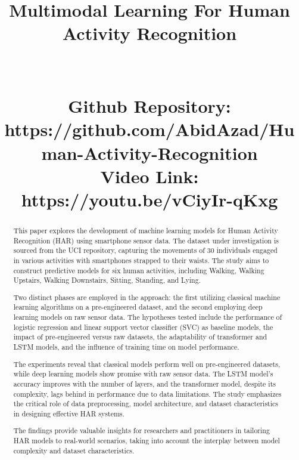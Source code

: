 \documentclass[conference]{IEEEtran}
\begin{document}
\title{Multimodal Learning For Human Activity Recognition
\\ \footnotesize \\ \phantom{} \\ \textsuperscript{} Github Repository: https://github.com/AbidAzad/Human-Activity-Recognition \\ Video Link: https://youtu.be/vCiyIr-qKxg}

\author{
\and
{}
}
\maketitle

\begin{abstract}
This paper explores the development of machine learning models for Human Activity Recognition (HAR) using smartphone sensor data. The dataset under investigation is sourced from the UCI repository, capturing the movements of 30 individuals engaged in various activities with smartphones strapped to their waists. The study aims to construct predictive models for six human activities, including Walking, Walking Upstairs, Walking Downstairs, Sitting, Standing, and Lying.

Two distinct phases are employed in the approach: the first utilizing classical machine learning algorithms on a pre-engineered dataset, and the second employing deep learning models on raw sensor data. The hypotheses tested include the performance of logistic regression and linear support vector classifier (SVC) as baseline models, the impact of pre-engineered versus raw datasets, the adaptability of transformer and LSTM models, and the influence of training time on model performance.

The experiments reveal that classical models perform well on pre-engineered datasets, while deep learning models show promise with raw sensor data. The LSTM model's accuracy improves with the number of layers, and the transformer model, despite its complexity, lags behind in performance due to data limitations. The study emphasizes the critical role of data preprocessing, model architecture, and dataset characteristics in designing effective HAR systems.

The findings provide valuable insights for researchers and practitioners in tailoring HAR models to real-world scenarios, taking into account the interplay between model complexity and dataset characteristics.
\end{abstract}
\end{document}
